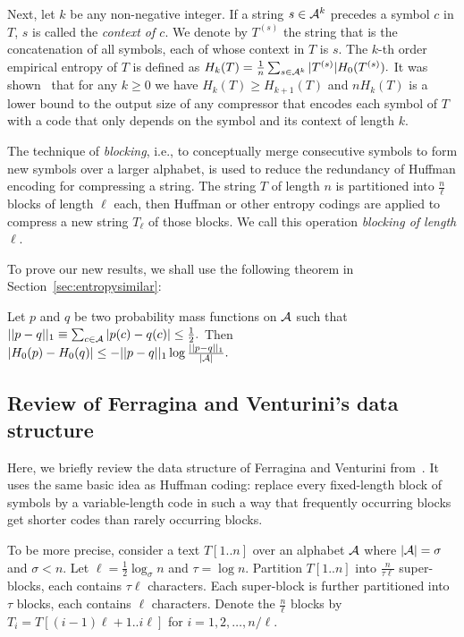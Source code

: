 \documentclass{llncs}
\begin{document}
Next, let $k$ be any non-negative integer.
If a string $s \in {\cal A}^k$ precedes a symbol $c$ in $T$,
$s$ is called the \emph{context of $c$}.
We denote by $T^{(s)}$ the string that is the concatenation of 
all symbols, each of whose context in $T$ is $s$.
The $k$-th order empirical entropy of $T$ is defined as
$H_k(T) = \frac{1}{n} \sum_{s \in {\cal A}^k} |T^{(s)}| H_0(T^{(s)}).$
It was shown~\cite{Man01} that for any $k \ge 0$ we have $H_k(T) \ge H_{k+1}(T)$
and $n H_k(T)$ is a lower bound to the output size of any compressor that encodes each symbol
of $T$ with a code that only depends on the symbol and its context of length $k$.

The technique of \emph{blocking}, i.e., to conceptually merge consecutive
symbols to form new symbols over a larger alphabet, 
is used to reduce the redundancy of Huffman encoding
for compressing a string.  The string $T$ of length $n$ is partitioned into $\frac{n}{\ell}$ blocks
of length $\ell$ each, then Huffman or other entropy codings are applied to compress a new string
$T_\ell$ of those blocks.  We call this operation \emph{blocking of length $\ell$}.


To prove our new results, we shall use the following theorem in
Section~\ref{sec:entropysimilar}:
\begin{theorem}\label{th:l1bound}
Let $p$ and $q$ be two probability mass functions on ${\cal A}$ such that
$|| p - q ||_1 \equiv \sum_{c \in {\cal A}} | p(c) - q(c) | \le \frac{1}{2}.$
Then
$|H_0(p) - H_0(q)| \le - || p - q ||_1 \log \frac{|| p - q ||_1}{|{\cal A}|}.$
\end{theorem}


\subsection{Review of Ferragina and Venturini's data structure}\label{sec:FV}

Here, we briefly review the data structure of Ferragina and
Venturini from~\cite{FerVen07b}.
It uses the same basic idea as Huffman coding:
replace every fixed-length block of symbols by a variable-length code
in such a way that frequently occurring blocks get shorter codes than
rarely occurring blocks.

To be more precise, consider a text $T[1..n]$ over an alphabet ${\cal A}$ 
where $|{\cal A}| = \sigma$ and $\sigma < n$.
Let $\ell = \frac{1}{2}\log_{\sigma} n$ and $\tau = \log n$.
Partition $T[1..n]$ into $\frac{n}{\tau \ell}$ super-blocks,
each contains $\tau \ell$ characters.
Each super-block is further partitioned into $\tau$ blocks,
each contains $\ell$ characters.
Denote the $\frac{n}{\ell}$ blocks
by $T_i = T[(i-1) \ell+1..i \ell]$ for $i=1, 2, \ldots, n/\ell$.
\end{document}
